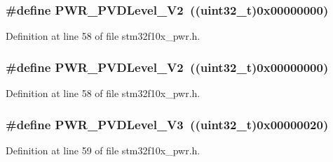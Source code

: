 \subsubsection[{\texorpdfstring{P\+W\+R\+\_\+\+P\+V\+D\+Level\+\_\+2\+V2}{PWR_PVDLevel_2V2}}]{\setlength{\rightskip}{0pt plus 5cm}\#define P\+W\+R\+\_\+\+P\+V\+D\+Level\+\_\+V2~(({\bf uint32\+\_\+t})0x00000000)}\hypertarget{group___p_v_d__detection__level_ga5cf8b09ed099c7412fcee6ccec2ec20b}{}\label{group___p_v_d__detection__level_ga5cf8b09ed099c7412fcee6ccec2ec20b}


Definition at line 58 of file stm32f10x\+\_\+pwr.\+h.

\subsubsection[{\texorpdfstring{P\+W\+R\+\_\+\+P\+V\+D\+Level\+\_\+2\+V2}{PWR_PVDLevel_2V2}}]{\setlength{\rightskip}{0pt plus 5cm}\#define P\+W\+R\+\_\+\+P\+V\+D\+Level\+\_\+V2~(({\bf uint32\+\_\+t})0x00000000)}\hypertarget{group___p_v_d__detection__level_ga5cf8b09ed099c7412fcee6ccec2ec20b}{}\label{group___p_v_d__detection__level_ga5cf8b09ed099c7412fcee6ccec2ec20b}


Definition at line 58 of file stm32f10x\+\_\+pwr.\+h.

\subsubsection[{\texorpdfstring{P\+W\+R\+\_\+\+P\+V\+D\+Level\+\_\+2\+V3}{PWR_PVDLevel_2V3}}]{\setlength{\rightskip}{0pt plus 5cm}\#define P\+W\+R\+\_\+\+P\+V\+D\+Level\+\_\+V3~(({\bf uint32\+\_\+t})0x00000020)}\hypertarget{group___p_v_d__detection__level_ga561e543dedb4c2cb126ec8d9d604260c}{}\label{group___p_v_d__detection__level_ga561e543dedb4c2cb126ec8d9d604260c}


Definition at line 59 of file stm32f10x\+\_\+pwr.\+h.

